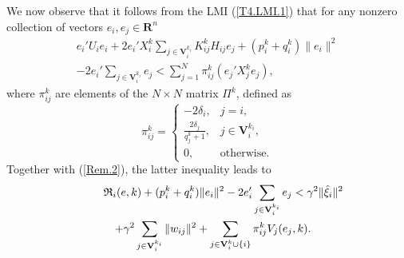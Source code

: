 \documentclass[a4paper,twocolumn]{autart}
\begin{document}
We now observe that it follows from the LMI (\ref{T4.LMI.1}) that for any
nonzero collection of vectors
$e_i,e_j\in \mathbf{R}^n$
\begin{eqnarray}
e_i'U_ie_i+2e_i'X_i^k\sum_{j\in
    \mathbf{V}_i^{k_i}}K_{ij}^kH_{ij}e_j+(p_i^k+q_i^k)\|e_i\|^2 \nonumber \\
-2e_i'\sum_{j\in\mathbf{V}_i^{k_i}}e_j
< \sum_{j=1}^N \pi_{ij}^k (e_j'X_j^ke_j),
\label{Ui.2}
\end{eqnarray}
where  $\pi_{ij}^k$ are elements of the $N\times N$ 
matrix $\Pi^k$, defined as
\begin{equation}
  \label{pi}
  \pi_{ij}^k=\begin{cases} -2\delta_i, & j=i, \\
 \frac{2\delta_j}{q_j^k+1}, & j\in \mathbf{V}_i^{k_i}, \\
0, &\text{otherwise}.
\end{cases}  
\end{equation}
Together with (\ref{Rem.2}), the latter inequality leads to 
\begin{eqnarray}
\lefteqn{\mathfrak{R}_i(e,k)+(p_i^k+q_i^k) \|e_i\|^2-2e_i' \sum_{j\in\mathbf{V}_i^{k_i}} e_j< \gamma^2\|\hat \xi_i\|^2} && \nonumber \\
&& +\gamma^2\sum_{j\in
  \mathbf{V}_i^{k_i}} \|w_{ij}\|^2 +
\sum_{j\in\mathbf{V}_i^k\cup \{i\}} \pi_{ij}^k V_j(e_j,k). 
\label{***}
\end{eqnarray}
\end{document}
